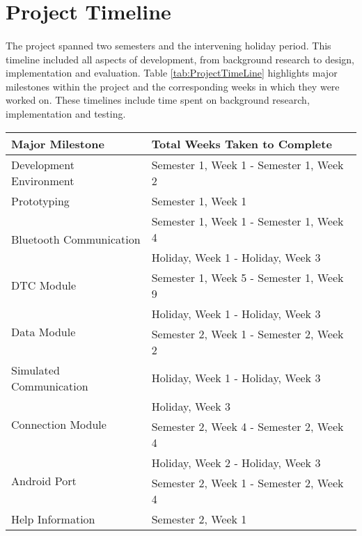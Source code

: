 {\section{Project Timeline}
	\paragraph{}{
	The project spanned two semesters and the intervening holiday period. This timeline included all aspects of development, from background research to design, implementation and evaluation. Table \ref{tab:ProjectTimeLine} highlights major milestones within the project and the corresponding weeks in which they were worked on. These timelines include time spent on background research, implementation and testing.
	}
	\begin{table}[ht]		
			\begin{center}				
				\begin{tabularx}{\textwidth}{| X | l |}								
				\hline
				\textbf{Major Milestone} & \textbf{Total Weeks Taken to Complete}\\
				\hline				
				Development Environment & Semester 1, Week 1 - Semester 1, Week 2\\
				\hline
				Prototyping & Semester 1, Week 1\\
				\hline
				\multirow{2}{*}{Bluetooth Communication} & Semester 1, Week 1 - Semester 1, Week 4\\
														 & Holiday, Week 1 - Holiday, Week 3\\
				\hline
				DTC Module & Semester 1, Week 5 - Semester 1, Week 9\\
				\hline
				\multirow{2}{*}{Data Module} & Holiday, Week 1 - Holiday, Week 3\\
											 & Semester 2, Week 1 - Semester 2, Week 2\\
				\hline				
				Simulated Communication & Holiday, Week 1 - Holiday, Week 3\\
				\hline
				\multirow{2}{*}{Connection Module} & Holiday, Week 3\\
				  								   & Semester 2, Week 4 - Semester 2, Week 4\\
				\hline
				\multirow{2}{*}{Android Port} & Holiday, Week 2 - Holiday, Week 3\\ %
											  & Semester 2, Week 1 - Semester 2, Week 4\\
				\hline
				Help Information & Semester 2, Week 1\\

\end{tabularx}
\end{center}
\end{table}}
